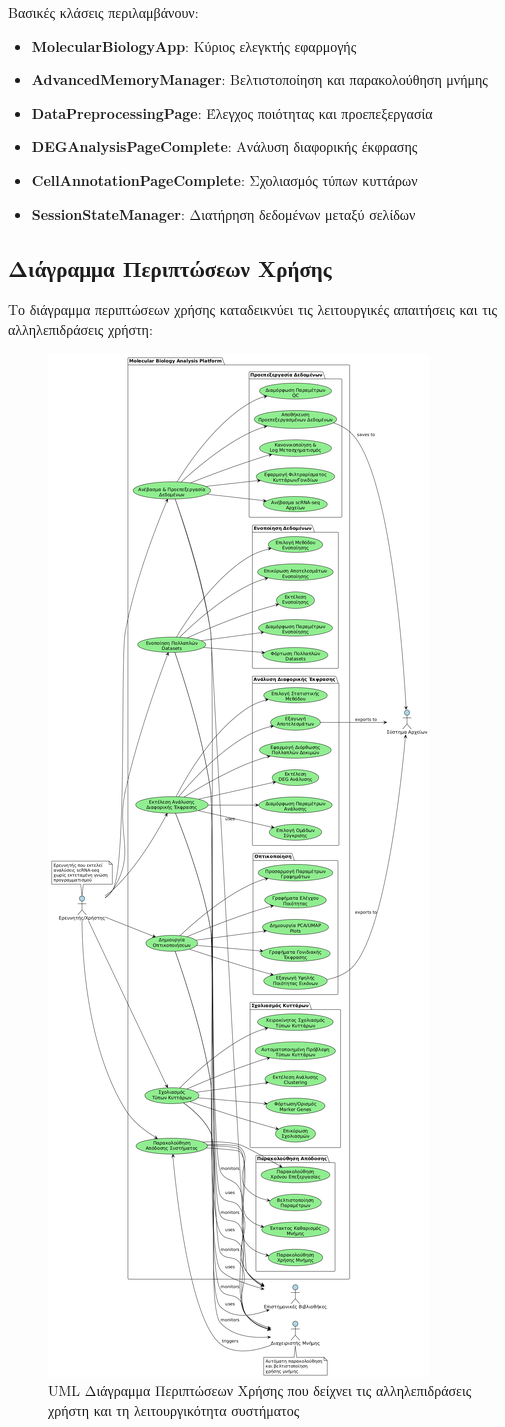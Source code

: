 \documentclass[11pt,a4paper]{article}
\begin{document}
Βασικές κλάσεις περιλαμβάνουν:
\begin{itemize}
    \item \textbf{MolecularBiologyApp}: Κύριος ελεγκτής εφαρμογής
    \item \textbf{AdvancedMemoryManager}: Βελτιστοποίηση και παρακολούθηση μνήμης
    \item \textbf{DataPreprocessingPage}: Έλεγχος ποιότητας και προεπεξεργασία
    \item \textbf{DEGAnalysisPageComplete}: Ανάλυση διαφορικής έκφρασης
    \item \textbf{CellAnnotationPageComplete}: Σχολιασμός τύπων κυττάρων
    \item \textbf{SessionStateManager}: Διατήρηση δεδομένων μεταξύ σελίδων
\end{itemize}

\subsection{Διάγραμμα Περιπτώσεων Χρήσης}

Το διάγραμμα περιπτώσεων χρήσης καταδεικνύει τις λειτουργικές απαιτήσεις και τις αλληλεπιδράσεις χρήστη:

\begin{figure}[H]
    \centering
    \includegraphics[width=0.5\linewidth]{UML_UseCase_Diagram.png}
    \caption{UML Διάγραμμα Περιπτώσεων Χρήσης που δείχνει τις αλληλεπιδράσεις χρήστη και τη λειτουργικότητα συστήματος}
    \label{fig:use_case_diagram}
\end{figure}
\end{document}
